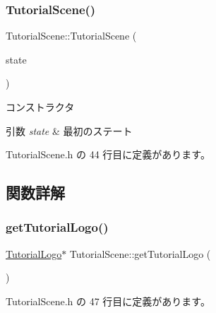 \subsubsection{\texorpdfstring{Tutorial\+Scene()}{TutorialScene()}}
{\footnotesize\ttfamily Tutorial\+Scene\+::\+Tutorial\+Scene (\begin{DoxyParamCaption}\item[{\mbox{\hyperlink{class_scene_base_1_1_state_base}{State\+Base}} $\ast$}]{state }\end{DoxyParamCaption})\hspace{0.3cm}{\ttfamily [inline]}}



コンストラクタ 


\begin{DoxyParams}{引数}
{\em state} & 最初のステート \\
\hline
\end{DoxyParams}


 Tutorial\+Scene.\+h の 44 行目に定義があります。



\subsection{関数詳解}
\mbox{\label{class_tutorial_scene_a2038b4fe667b7a69080a8c9c752f7fb9}} 
\subsubsection{\texorpdfstring{get\+Tutorial\+Logo()}{getTutorialLogo()}}
{\footnotesize\ttfamily \mbox{\hyperlink{class_tutorial_logo}{Tutorial\+Logo}}$\ast$ Tutorial\+Scene\+::get\+Tutorial\+Logo (\begin{DoxyParamCaption}{ }\end{DoxyParamCaption})\hspace{0.3cm}{\ttfamily [inline]}}



 Tutorial\+Scene.\+h の 47 行目に定義があります。


